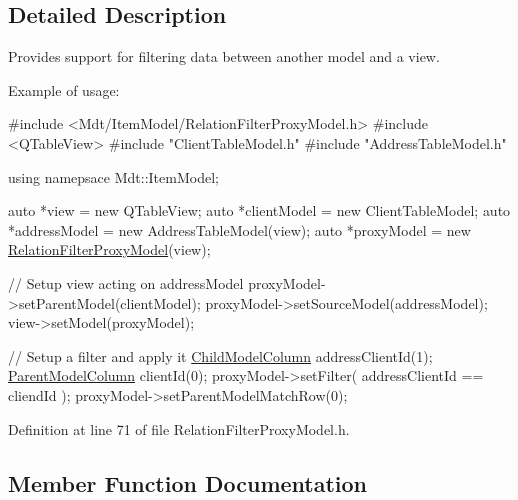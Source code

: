\subsection{Detailed Description}
Provides support for filtering data between another model and a view. 

Example of usage\+: 
\begin{DoxyCode}
\textcolor{preprocessor}{#include <Mdt/ItemModel/RelationFilterProxyModel.h>}
\textcolor{preprocessor}{#include <QTableView>}
\textcolor{preprocessor}{#include "ClientTableModel.h"}
\textcolor{preprocessor}{#include "AddressTableModel.h"}

\textcolor{keyword}{using} namepsace Mdt::ItemModel;

\textcolor{keyword}{auto} *view = \textcolor{keyword}{new} QTableView;
\textcolor{keyword}{auto} *clientModel = \textcolor{keyword}{new} ClientTableModel;
\textcolor{keyword}{auto} *addressModel = \textcolor{keyword}{new} AddressTableModel(view);
\textcolor{keyword}{auto} *proxyModel = \textcolor{keyword}{new} \hyperlink{class_mdt_1_1_item_model_1_1_relation_filter_proxy_model_ac7b4404a6b4a87c1b083d53716fb0d43}{RelationFilterProxyModel}(view);

\textcolor{comment}{// Setup view acting on addressModel}
proxyModel->setParentModel(clientModel);
proxyModel->setSourceModel(addressModel);
view->setModel(proxyModel);

\textcolor{comment}{// Setup a filter and apply it}
\hyperlink{namespace_mdt_1_1_item_model_a60ac754611ae43e31bbe5244b2d24297}{ChildModelColumn} addressClientId(1);
\hyperlink{namespace_mdt_1_1_item_model_a65a3c4f6cfb3d80d7f69e58cd17d8be7}{ParentModelColumn} clientId(0);
proxyModel->setFilter( addressClientId == cliendId );
proxyModel->setParentModelMatchRow(0);
\end{DoxyCode}
 

Definition at line 71 of file Relation\+Filter\+Proxy\+Model.\+h.



\subsection{Member Function Documentation}
